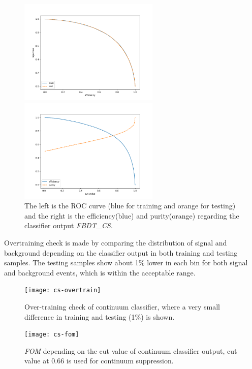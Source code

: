 \begin{figure}[ht]
	\begin{minipage}[b]{0.5\linewidth}
		\centering 
		\includegraphics[height=5cm]{figures/ROC_CS}	
	\end{minipage}
	\begin{minipage}[b]{0.5\linewidth}
		\centering 
		\includegraphics[height=5cm]{figures/eff_CS}	
	\end{minipage}
\caption{The left is the ROC curve (blue for training and orange for testing)
	and the right is the efficiency(blue) and purity(orange) regarding the classifier output \textit{FBDT\_CS}.}
	\label{fig:cs_roc}
\end{figure}
Overtraining check is made by comparing the distribution of signal and background depending on the classifier output in both training and testing samples. The testing samples show about 1\% lower in each bin for both signal and background events, which is within the acceptable range.  
\begin{figure}[H]
	\centering
	\texttt{[image: cs-overtrain]}
	\caption{Over-training check of continuum classifier, where a very small difference in training and testing (1\%) is shown.}
\end{figure}

\begin{figure}[H]
	\centering
	\texttt{[image: cs-fom]}
	\caption{\textit{FOM} depending on the cut value of continuum classifier output, cut value at 0.66 is used for continuum suppression. }
	\label{fig:cs_fom}
\end{figure}

